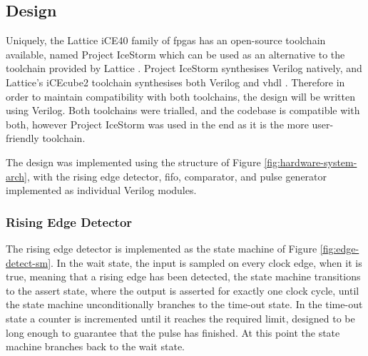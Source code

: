 \subsection{ Design}

Uniquely, the Lattice iCE40 family of \glspl{fpga} has an open-source toolchain available, named Project IceStorm \cite{icestorm} which can be used as an alternative to the toolchain provided by Lattice \cite{icestorm}. Project IceStorm synthesises Verilog natively, and Lattice's iCEcube2 toolchain synthesises both Verilog and \gls{vhdl} \cite[p.10]{lattice2017c} \cite{icestorm}. Therefore in order to maintain compatibility with both toolchains, the design will be written using Verilog. Both toolchains were trialled, and the codebase is compatible with both, however Project IceStorm was used in the end as it is the more user-friendly toolchain.

The design was implemented using the structure of Figure \ref{fig:hardware-system-arch}, with the rising edge detector, \gls{fifo}, comparator, and pulse generator implemented as individual Verilog modules.

\subsubsection{Rising Edge Detector}

The rising edge detector is implemented as the state machine of Figure \ref{fig:edge-detect-sm}. In the wait state, the input is sampled on every clock edge, when it is true, meaning that a rising edge has been detected, the state machine transitions to the assert state, where the output is asserted for exactly one clock cycle, until the state machine unconditionally branches to the time-out state. In the time-out state a counter is incremented until it reaches the required limit, designed to be long enough to guarantee that the pulse has finished. At this point the state machine branches back to the wait state.

